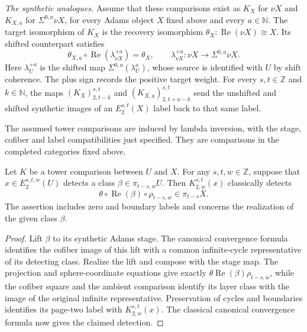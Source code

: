 \begin{definition}
\emph{The synthetic analogues.} Assume that these comparisons exist as
$K_X$ for $\nu X$ and $K_{X,a}$ for $\Sigma^{0,a}\nu X$, for every
Adams object $X$ fixed above and every $a\in\mathbb N$.
The target isomorphism of $K_X$ is the recovery isomorphism
$\theta_X:\operatorname{Re}(\nu X)\cong X$. Its shifted counterpart
satisfies
\[
 \theta_{X,a}\circ\operatorname{Re}(\lambda^{+a}_{\nu X})=\theta_X,
 \qquad \lambda^{+a}_{\nu X}:\nu X\longrightarrow\Sigma^{0,a}\nu X.
\]
Here $\lambda^{+a}_U$ is the shifted map
$\Sigma^{0,a}(\lambda_U^a)$, whose source is identified with $U$ by
shift coherence. The plus sign records the positive target weight.
For every $s,t\in\mathbb Z$ and $k\in\mathbb N$, the maps
$(K_X)_{2,t-k}^{s,t}$ and $(K_{X,a})_{2,t+a-k}^{s,t}$ send the
unshifted and shifted synthetic images of an $E_2^{s,t}(X)$ label back to that
same label.

The assumed tower comparisons are induced by lambda inversion, with
the stage, cofiber and label compatibilities just specified. They are
comparisons in the completed categories fixed above.

\end{definition}

\begin{theorem}
\label{sem:Literature:lambda-inversion-detection}
Let $K$ be a tower comparison between $U$ and $X$. For any
$s,t,w\in\mathbb Z$, suppose that
$x\in E_2^{s,t,w}(U)$ detects a class
$\beta\in\pi_{t-s,w}U$. Then
$K_{2,w}^{s,t}(x)$ classically detects
\[
\theta\circ\operatorname{Re}(\beta)\circ\rho_{t-s,w}
\in\pi_{t-s}X.
\]
The assertion includes zero and boundary labels and concerns the
realization of the given class $\beta$.

\end{theorem}
\begin{proof}
Lift $\beta$ to its synthetic Adams stage. The canonical
convergence formula identifies the cofiber image of this lift with a
common infinite-cycle representative of its detecting class. Realize
the lift and compose with the stage map. The projection and
sphere-coordinate equations give exactly
$\theta\operatorname{Re}(\beta)\rho_{t-s,w}$, while the cofiber square
and the ambient comparison identify its layer class with the image of
the original infinite representative. Preservation of cycles and
boundaries identifies its page-two label with $K_{2,w}^{s,t}(x)$.
The classical canonical convergence formula now gives the claimed
detection.
\end{proof}

